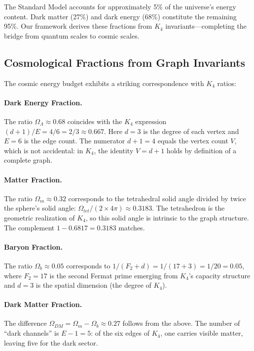 \documentclass[11pt,a4paper]{book}
\def\text#1{#1}%
\begin{document}
The Standard Model accounts for approximately 5\% of the universe's energy content. 
Dark matter (27\%) and dark energy (68\%) constitute the remaining 95\%. 
Our framework derives these fractions from $K_4$ invariants---completing the bridge
from quantum scales to cosmic scales.

\subsection{Cosmological Fractions from Graph Invariants}

The cosmic energy budget exhibits a striking correspondence with $K_4$ ratios:

\paragraph{Dark Energy Fraction.}
The ratio $\Omega_\Lambda \approx 0.68$ coincides with the $K_4$ expression $(d+1)/E = 4/6 = 2/3 \approx 0.667$.
Here $d = 3$ is the degree of each vertex and $E = 6$ is the edge count.
The numerator $d + 1 = 4$ equals the vertex count $V$, which is not accidental:
in $K_4$, the identity $V = d + 1$ holds by definition of a complete graph.

\paragraph{Matter Fraction.}
The ratio $\Omega_m \approx 0.32$ corresponds to the tetrahedral solid angle divided by twice 
the sphere's solid angle: $\Omega_{\text{tet}}/(2 \times 4\pi) \approx 0.3183$.
The tetrahedron is the geometric realization of $K_4$, so this solid angle is 
intrinsic to the graph structure. The complement $1 - 0.6817 = 0.3183$ matches.

\paragraph{Baryon Fraction.}
The ratio $\Omega_b \approx 0.05$ corresponds to $1/(F_2 + d) = 1/(17 + 3) = 1/20 = 0.05$,
where $F_2 = 17$ is the second Fermat prime emerging from $K_4$'s capacity structure
and $d = 3$ is the spatial dimension (the degree of $K_4$).

\paragraph{Dark Matter Fraction.}
The difference $\Omega_{\text{DM}} = \Omega_m - \Omega_b \approx 0.27$ follows from the above.
The number of ``dark channels'' is $E - 1 = 5$: of the six edges of $K_4$, one carries
visible matter, leaving five for the dark sector.
\end{document}
